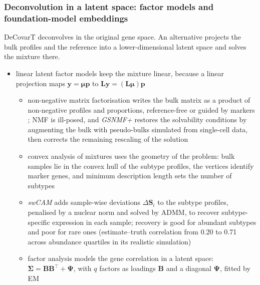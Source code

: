 \documentclass[pdflatex, sn-nature]{sn-jnl}
\theoremstyle{thmstyleone}%
\theoremstyle{thmstyletwo}%
\theoremstyle{thmstylethree}%
\begin{document}
\subsubsection{Deconvolution in a latent space: factor models and foundation-model embeddings}
\label{sec:latent-space}

DeCovarT deconvolves in the original gene space.
An alternative projects the bulk profiles and the reference into a lower-dimensional latent space
and solves the mixture there.

\begin{itemize}
  \item linear latent factor models keep the mixture linear, because a linear projection maps
        \(\boldsymbol{y}=\boldsymbol{\mu}\boldsymbol{p}\) to \(\boldsymbol{L}\boldsymbol{y}=(\boldsymbol{L}\boldsymbol{\mu})\boldsymbol{p}\)
  \begin{itemize}
    \item non-negative matrix factorisation writes the bulk matrix as a product of non-negative profiles
          and proportions, reference-free or guided by markers
          \cite{tangNITUMIDNonnegativeMatrix2020,hoyerNonnegativeMatrixFactorization2004}; NMF is ill-posed, and
          \emph{GSNMF+} restores the solvability conditions by augmenting the bulk with pseudo-bulks simulated
          from single-cell data, then corrects the remaining rescaling of the solution
          \cite{liAugmentedGSNMFModel2025}
    \item convex analysis of mixtures uses the geometry of the problem: bulk samples lie in the convex
          hull of the subtype profiles, the vertices identify marker genes, and minimum description length
          sets the number of subtypes \cite{chenCAMTHCConvexAnalysis2019}
    \item \emph{swCAM} adds sample-wise deviations \(\Delta\boldsymbol{S}_{i}\) to the subtype profiles, penalised by a
          nuclear norm and solved by ADMM, to recover subtype-specific expression in each sample; recovery is
          good for abundant subtypes and poor for rare ones (estimate--truth correlation from 0.20 to 0.71
          across abundance quartiles in its realistic simulation) \cite{chenSwCAMEstimationSubtypespecific2022}
    \item factor analysis models the gene correlation in a latent space: \(\boldsymbol{\Sigma}=\boldsymbol{B}\boldsymbol{B}^{\top}+\boldsymbol{\Psi}\),
          with \(q\) factors as loadings \(\boldsymbol{B}\) and a diagonal \(\boldsymbol{\Psi}\), fitted by EM

\end{itemize}
\end{itemize}
\end{document}
